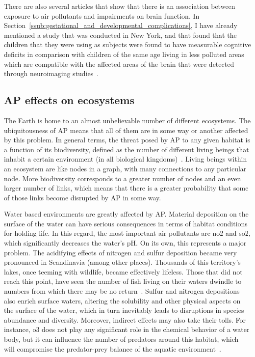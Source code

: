 There are also several articles that show that there is an association
between exposure to air pollutants and impairments on brain function.
In Section~\ref{ssub:gestational_and_developmental_complications},  I
have already mentioned a study that was conducted in New York, and that
found that the children that they were using as subjects were found to
have measurable cognitive deficits in comparison with children of the
same age living in less polluted areas which are compatible with the
affected areas of the brain that were detected through neuroimaging
studies~\cite{DePradoBert2018}.

\subsection{\acrlong{AP} effects on ecosystems}%
\label{sub:ap_effects_on_ecosystems}
The Earth is home to an almost unbelievable number of different
ecosystems. The ubiquitousness of \gls{AP} means that all of them are in
some way or another affected by this problem. In general terms, the
threat posed by \gls{AP} to any given habitat is a function of its
biodiversity, defined as the number of different living beings that
inhabit a certain environment (in all biological
kingdoms)~\cite{OxfordPress2020}. Living beings within an ecosystem are
like nodes in a graph, with many connections to any particular node.
More biodiversity corresponds to a greater number of nodes and an even
larger number of links,  which means that there is a greater probability
that some of those links become disrupted by \acrlong{AP} in some way.

Water based environments are greatly affected by \gls{AP}. Material
deposition on the surface of the water can have serious consequences in
terms of habitat conditions for holding life. In this regard, the most
important air pollutants are \gls{no2} and \gls{so2},  which
significantly decreases the water's pH. On its own, this represents a
major problem. The acidifying effects of nitrogen and sulfur deposition
became very pronounced in Scandinavia (among other places). Thousands of
this territory's lakes, once teeming with wildlife, became effectively
lifeless. Those that did not reach this point, have seen the number of
fish living on their waters dwindle to numbers from which there may be
no return~\cite{DeWit2015}. Sulfur and nitrogen depositions also enrich
surface waters, altering the solubility and other physical aspects on
the surface of the water, which in turn inevitably leads to disruptions
in species abundance and diversity. Moreover, indirect effects may also
take their tolls. For instance, \gls{o3} does not play any significant
role in the chemical behavior of a water body, but it can influence the
number of predators around this habitat, which will compromise the
predator-prey balance of the aquatic environment~\cite{Vallero2014,
Lovett2009}.

